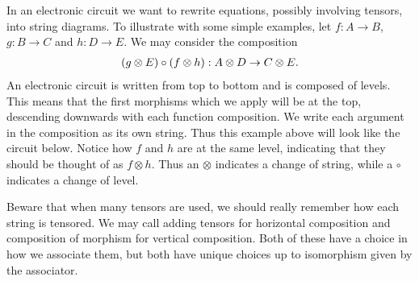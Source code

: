 \documentclass[../thesis.tex]{subfiles}
\begin{document}
            In an electronic circuit we want to rewrite equations, possibly involving tensors, into string diagrams. To illustrate with some simple examples, let $f : A \rightarrow B$, $g : B \rightarrow C$ and $h : D \rightarrow E$. We may consider the composition
            \begin{align*}
                (g \otimes E) \circ (f \otimes h) : A \otimes D \rightarrow C \otimes E \tt{.}
            \end{align*}
            An electronic circuit is written from top to bottom and is composed of levels. This means that the first morphisms which we apply will be at the top, descending downwards with each function composition. We write each argument in the composition as its own string. Thus this example above will look like the circuit below. Notice how $f$ and $h$ are at the same level, indicating that they should be thought of as $f \otimes h$. Thus an $\otimes$ indicates a change of string, while a $\circ$ indicates a change of level.
            
            Beware that when many tensors are used, we should really remember how each string is tensored. We may call adding tensors for horizontal composition and composition of morphism for vertical composition. Both of these have a choice in how we associate them, but both have unique choices up to isomorphism given by the associator. 
            \begin{center}
            \end{center}
\end{document}
